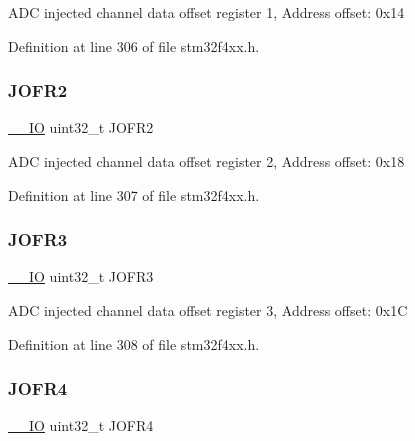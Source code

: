 A\+DC injected channel data offset register 1, Address offset\+: 0x14 

Definition at line 306 of file stm32f4xx.\+h.

\mbox{\label{struct_a_d_c___type_def_a11e65074b9f06b48c17cdfa5bea9f125}} 
\subsubsection{\texorpdfstring{J\+O\+F\+R2}{JOFR2}}
{\footnotesize\ttfamily \hyperlink{group___c_m_s_i_s__core__definitions_gaec43007d9998a0a0e01faede4133d6be}{\+\_\+\+\_\+\+IO} uint32\+\_\+t J\+O\+F\+R2}

A\+DC injected channel data offset register 2, Address offset\+: 0x18 

Definition at line 307 of file stm32f4xx.\+h.

\mbox{\label{struct_a_d_c___type_def_a613f6b76d20c1a513976b920ecd7f4f8}} 
\subsubsection{\texorpdfstring{J\+O\+F\+R3}{JOFR3}}
{\footnotesize\ttfamily \hyperlink{group___c_m_s_i_s__core__definitions_gaec43007d9998a0a0e01faede4133d6be}{\+\_\+\+\_\+\+IO} uint32\+\_\+t J\+O\+F\+R3}

A\+DC injected channel data offset register 3, Address offset\+: 0x1C 

Definition at line 308 of file stm32f4xx.\+h.

\mbox{\label{struct_a_d_c___type_def_a2fd59854223e38158b4138ee8e913ab3}} 
\subsubsection{\texorpdfstring{J\+O\+F\+R4}{JOFR4}}
{\footnotesize\ttfamily \hyperlink{group___c_m_s_i_s__core__definitions_gaec43007d9998a0a0e01faede4133d6be}{\+\_\+\+\_\+\+IO} uint32\+\_\+t J\+O\+F\+R4}

